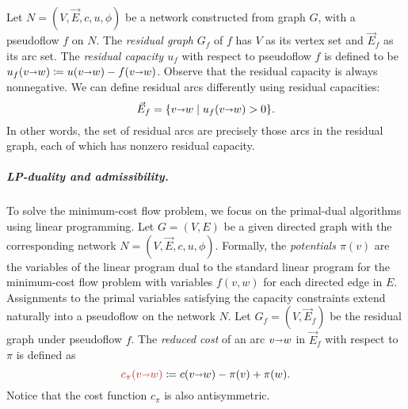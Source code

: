 \documentclass[a4paper,UKenglish]{socg-lipics-v2018}
\makeatletter
\def\fsupply{\phi}
\def\arcto{\mathord\shortrightarrow}
\def\arc#1#2{#1\arcto#2}
\theoremstyle{plain}
\numberwithin{figure}{section}
\renewcommand{\paragraph}{\subparagraph}
\def\EMPH#1{\textcolor{BrickRed}{{\emph{#1}}}}
\def\n@te#1{\textsf{\boldmath \textbf{$\langle\!\langle$#1$\rangle\!\rangle$}}\leavevmode}
\def\note#1{\textcolor{red}{\n@te{#1}}}
\renewcommand{\note}[1]{} %
\makeatother
\begin{document}
\begin{toappendix}
Let $N = (V,\vec{E},c,u,\fsupply)$ be a network constructed from graph $G$, with a pseudoflow $f$ on $N$.
The \EMPH{residual graph} $G_f$ of $f$ has $V$ as its vertex set and $\vec{E}_f$ as its arc set.
%
The \EMPH{residual capacity $u_f$} with respect to
pseudoflow $f$ is defined to be $u_f(\arc vw) \coloneqq u(\arc vw) - f(\arc vw)$.
Observe that the residual capacity is always nonnegative.
We can define residual arcs differently using residual capacities:
\[
\vec{E}_f = \{\arc vw \mid u_f(\arc vw) > 0\}.
\]
In other words, the set of residual arcs are precisely those arcs in the residual graph, each of which has nonzero residual capacity.
%
%
%

\end{toappendix}

\paragraph{LP-duality and admissibility.}
To solve the minimum-cost flow problem, we focus on the primal-dual algorithms using linear programming.
Let $G = (V,E)$ be a given directed graph with the corresponding network $N = (V,\vec{E},c,u,\fsupply)$.
Formally, the
\EMPH{potentials $\pi(v)$} are the variables of the linear program dual to the standard linear program for the minimum-cost flow problem with variables $f(v,w)$ for each directed edge in $E$.
Assignments to the primal variables satisfying the capacity constraints extend naturally into a pseudoflow on the network $N$.
Let $G_f = (V,\vec{E}_f)$ be the residual graph under pseudoflow $f$.
The \EMPH{reduced cost} of an arc $\arc vw$ in $\vec{E}_f$ with respect to $\pi$ is defined as
\[
\EMPH{$c_\pi(\arc vw)$} \coloneqq c(\arc vw) - \pi(v) + \pi(w).
\]
Notice that the cost function $c_\pi$ is also antisymmetric.
\end{document}
